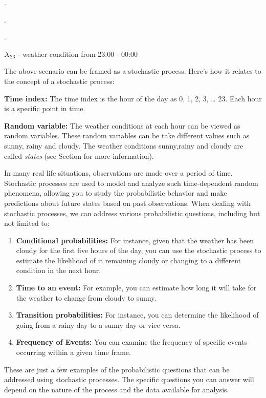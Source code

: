 \documentclass[
  letterpaper,
  DIV=11,
  numbers=noendperiod]{scrreprt}
\begin{document}
.

.

.

\(X_{23}\) - weather condition from 23:00 - 00:00

The above scenario can be framed as a stochastic process. Here's how it
relates to the concept of a stochastic process:

\textbf{Time index:} The time index is the hour of the day as 0, 1, 2,
3, \ldots{} 23. Each hour is a specific point in time.

\textbf{Random variable:} The weather conditions at each hour can be
viewed as random variables. These random variables can be take different
values such as sunny, rainy and cloudy. The weather conditions
sunny,rainy and cloudy are called \emph{states} (see Section for more
information).

In many real life situations, observations are made over a period of
time. Stochastic processes are used to model and analyze such
time-dependent random phenomena, allowing you to study the probabilistic
behavior and make predictions about future states based on past
observations. When dealing with stochastic processes, we can address
various probabilistic questions, including but not limited to:

\begin{enumerate}
\def\labelenumi{\arabic{enumi}.}
\item
  \textbf{Conditional probabilities: }For instance, given that the
  weather has been cloudy for the first five hours of the day, you can
  use the stochastic process to estimate the likelihood of it remaining
  cloudy or changing to a different condition in the next hour.
\item
  \textbf{Time to an event: } For example, you can estimate how long it
  will take for the weather to change from cloudy to sunny.
\item
  \textbf{Transition probabilities: } For instance, you can determine
  the likelihood of going from a rainy day to a sunny day or vice versa.
\item
  \textbf{Frequency of Events:} You can examine the frequency of
  specific events occurring within a given time frame.
\end{enumerate}

These are just a few examples of the probabilistic questions that can be
addressed using stochastic processes. The specific questions you can
answer will depend on the nature of the process and the data available
for analysis.
\end{document}
